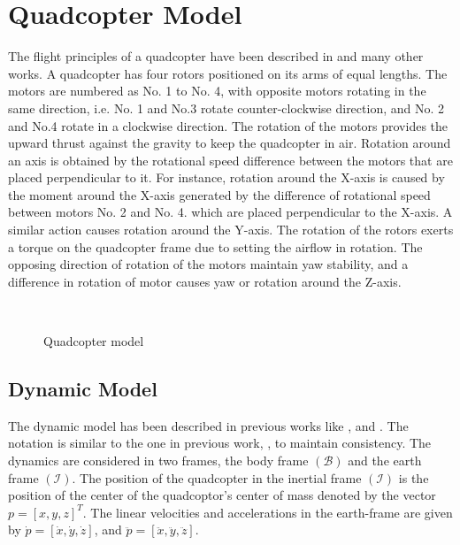 \documentclass[letterpaper%
, twoside%
, 12pt%
,memoire%
, english%
,creativecommons,hyperref%
]{thETS}
\begin{document}
\chapter{Quadcopter Model} \label{Chap:Quad}
The flight principles of a quadcopter have been described in \citep{RN71} and many other works.
A quadcopter has four rotors positioned on its arms of equal lengths. The motors are numbered as No. 1 to No. 4, with opposite motors rotating in the same direction, i.e. No. 1 and No.3 rotate counter-clockwise direction, and No. 2 and No.4 rotate in a clockwise direction. The rotation of the motors provides the upward thrust against the gravity to keep the quadcopter in air. Rotation around an axis is obtained by the rotational speed difference between the motors that are placed perpendicular to it. For instance, rotation around the X-axis is caused by the moment around the X-axis generated by the difference of rotational speed between motors No. 2 and No. 4. which are placed perpendicular to the X-axis. A similar action causes rotation around the Y-axis. The rotation of the rotors exerts a torque on the quadcopter frame due to setting the airflow in rotation. The opposing direction of rotation of the motors maintain yaw stability, and a difference in rotation of motor causes yaw or rotation around the Z-axis.

\begin{figure}[H]
	\centering
	\resizebox{0.75\textwidth}{!}{\fbox{}}
	 \\ \parbox{0.75\textwidth}{\caption{Quadcopter model\label{Fig:quadSchematic}}}
\end{figure}



\section{Dynamic Model}
The dynamic model has been described in previous works like \citep{hoffmann2007quadrotor}, \citep{zheng2014second} and \citep{alexis2012model}. The notation is similar to the one in previous work, \citep{RN114}, to maintain consistency. 
The dynamics are considered in two frames, the body frame $(\mathcal{B})$ and the earth frame $(\mathcal{I})$. The position of the quadcopter in the inertial frame $(\mathcal{I})$ is the position of the center of the quadcoptor's center of mass denoted by the vector $p=[x,y,z]^{T}$. The linear velocities and accelerations in the earth-frame are given by $\dot{p}=[\dot{x},\dot{y},\dot{z}]$, and $\ddot{p}=[\ddot{x},\ddot{y},\ddot{z}]$. 
\end{document}
